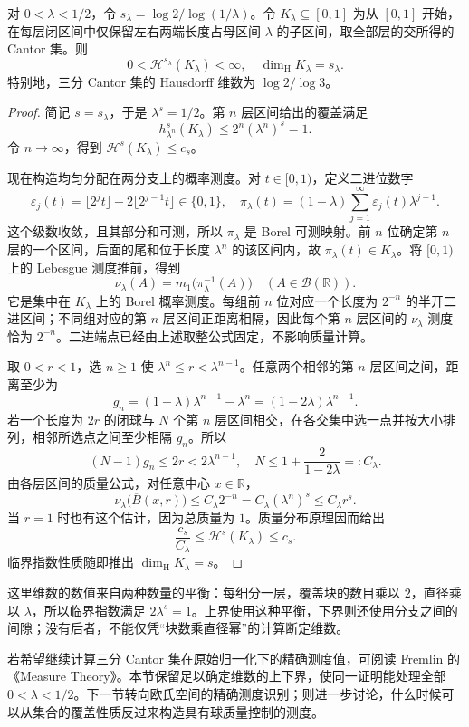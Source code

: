 \begin{proposition}
\label{b1:prop:cantor-hausdorff-dimension}
对 \(0<\lambda<1/2\)，令 \(s_\lambda=\log2/\log(1/\lambda)\)。令 \(K_\lambda\subseteq[0,1]\) 为从 \([0,1]\) 开始，在每层闭区间中仅保留左右两端长度占母区间 \(\lambda\) 的子区间，取全部层的交所得的 Cantor 集。则
\[
0<\mathcal H^{s_\lambda}(K_\lambda)<\infty,
\quad
\dim_{\mathrm H}K_\lambda=s_\lambda.
\]
特别地，三分 Cantor 集的 Hausdorff 维数为 \(\log2/\log3\)。
\end{proposition}
\begin{proof}
简记 \(s=s_\lambda\)，于是 \(\lambda^s=1/2\)。第 \(n\) 层区间给出的覆盖满足
\[
h^s_{\lambda^n}(K_\lambda)
\leq2^n(\lambda^n)^s=1.
\]
令 \(n\to\infty\)，得到 \(\mathcal H^s(K_\lambda)\leq c_s\)。

现在构造均匀分配在两分支上的概率测度。对 \(t\in[0,1)\)，定义二进位数字
\[
\varepsilon_j(t)=\lfloor2^jt\rfloor-2\lfloor2^{j-1}t\rfloor\in\{0,1\},
\quad
\pi_\lambda(t)=(1-\lambda)\sum_{j=1}^{\infty}\varepsilon_j(t)\lambda^{j-1}.
\]
这个级数收敛，且其部分和可测，所以 \(\pi_\lambda\) 是 Borel 可测映射。前 \(n\) 位确定第 \(n\) 层的一个区间，后面的尾和位于长度 \(\lambda^n\) 的该区间内，故 \(\pi_\lambda(t)\in K_\lambda\)。将 \([0,1)\) 上的 Lebesgue 测度推前，得到
\[
\nu_\lambda(A)=m_1\bigl(\pi_\lambda^{-1}(A)\bigr)
\quad(A\in\mathcal B(\mathbb R)).
\]
它是集中在 \(K_\lambda\) 上的 Borel 概率测度。每组前 \(n\) 位对应一个长度为 \(2^{-n}\) 的半开二进区间；不同组对应的第 \(n\) 层区间正距离相隔，因此每个第 \(n\) 层区间的 \(\nu_\lambda\) 测度恰为 \(2^{-n}\)。二进端点已经由上述取整公式固定，不影响质量计算。

取 \(0<r<1\)，选 \(n\geq1\) 使 \(\lambda^n\leq r<\lambda^{n-1}\)。任意两个相邻的第 \(n\) 层区间之间，距离至少为
\[
g_n=(1-\lambda)\lambda^{n-1}-\lambda^n
=(1-2\lambda)\lambda^{n-1}.
\]
若一个长度为 \(2r\) 的闭球与 \(N\) 个第 \(n\) 层区间相交，在各交集中选一点并按大小排列，相邻所选点之间至少相隔 \(g_n\)。所以
\[
(N-1)g_n\leq2r<2\lambda^{n-1},
\quad
N\leq1+\frac{2}{1-2\lambda}=:C_\lambda.
\]
由各层区间的质量公式，对任意中心 \(x\in\mathbb R\)，
\[
\nu_\lambda\bigl(\overline B(x,r)\bigr)
\leq C_\lambda2^{-n}
=C_\lambda(\lambda^n)^s
\leq C_\lambda r^s.
\]
当 \(r=1\) 时也有这个估计，因为总质量为 \(1\)。质量分布原理因而给出
\[
\frac{c_s}{C_\lambda}\leq\mathcal H^s(K_\lambda)\leq c_s.
\]
临界指数性质随即推出 \(\dim_{\mathrm H}K_\lambda=s\)。
\end{proof}

这里维数的数值来自两种数量的平衡：每细分一层，覆盖块的数目乘以 \(2\)，直径乘以 \(\lambda\)，所以临界指数满足 \(2\lambda^s=1\)。上界使用这种平衡，下界则还使用分支之间的间隙；没有后者，不能仅凭“块数乘直径幂”的计算断定维数。

\ProseParagraphBreak

若希望继续计算三分 Cantor 集在原始归一化下的精确测度值，可阅读 Fremlin 的《Measure Theory》\cite[264J]{Fremlin2016Measure}。本节保留足以确定维数的上下界，使同一证明能处理全部 \(0<\lambda<1/2\)。下一节转向欧氏空间的精确测度识别；则进一步讨论，什么时候可以从集合的覆盖性质反过来构造具有球质量控制的测度。
